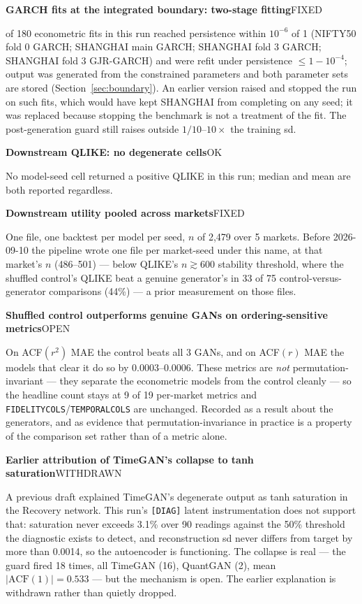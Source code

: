 \documentclass[11pt,a4paper]{article}
\makeatletter
\DeclareRobustCommand{\_}{\ifmmode\nfss@text{\textunderscore}\else\textunderscore\allowbreak\fi}
\newcommand{\auditrow}[5]{\par\medskip\noindent\textbf{#4}\hfill{\sffamily\footnotesize\textsc{#1}}\par\nopagebreak\noindent #5\par}
\makeatother
\begin{document}
\auditrow{FIXED}{Amber}{ABg}%
  {GARCH fits at the integrated boundary: two-stage fitting}%
  {12 of 180 econometric fits in this run reached persistence within $10^{-6}$ of 1 (NIFTY50 fold 0 GARCH; SHANGHAI main GARCH; SHANGHAI fold 3 GARCH; SHANGHAI fold 3 GJR-GARCH) and were refit under persistence $\le1-10^{-4}$; output was generated from the constrained parameters and both parameter sets are stored (Section~\ref{sec:boundary}). An earlier version raised and stopped the run on such fits, which would have kept SHANGHAI from completing on any seed; it was replaced because stopping the benchmark is not a treatment of the fit. The post-generation guard still raises outside $1/10$--$10\times$ the training sd.}

\auditrow{OK}{FGreen}{GBg}%
  {Downstream QLIKE: no degenerate cells}%
  {No model-seed cell returned a positive QLIKE in this run; median and mean are both reported regardless.}

\auditrow{FIXED}{Amber}{ABg}%
  {Downstream utility pooled across markets}%
  {One file, one backtest per model per seed, $n$ of 2,479 over 5 markets. Before 2026-09-10 the pipeline wrote one file per market-seed under this name, at that market's $n$ (486--501) --- below QLIKE's $n\gtrsim600$ stability threshold, where the shuffled control's QLIKE beat a genuine generator's in 33 of 75 control-versus-generator comparisons (44\%) --- a prior measurement on those files.}

\auditrow{OPEN}{Indigo}{IBg}%
  {Shuffled control outperforms genuine GANs on ordering-sensitive metrics}%
  {On ACF$(r^2)$ MAE the control beats all 3 GANs, and on ACF$(r)$ MAE the models that clear it do so by 0.0003--0.0006. These metrics are \emph{not} permutation-invariant --- they separate the econometric models from the control cleanly --- so the headline count stays at 9 of 19 per-market metrics and \texttt{FIDELITY\_COLS}/\texttt{TEMPORAL\_COLS} are unchanged. Recorded as a result about the generators, and as evidence that permutation-invariance in practice is a property of the comparison set rather than of a metric alone.}

\auditrow{WITHDRAWN}{Amber}{ABg}%
  {Earlier attribution of TimeGAN's collapse to tanh saturation}%
  {A previous draft explained TimeGAN's degenerate output as tanh saturation in the Recovery network. This run's \texttt{[DIAG]} latent instrumentation does not support that: saturation never exceeds 3.1\% over 90 readings against the 50\% threshold the diagnostic exists to detect, and reconstruction sd never differs from target by more than 0.0014, so the autoencoder is functioning. The collapse is real --- the guard fired 18 times, all TimeGAN (16), QuantGAN (2), mean $|\text{ACF}(1)| = 0.533$ --- but the mechanism is open. The earlier explanation is withdrawn rather than quietly dropped.}
\end{document}

